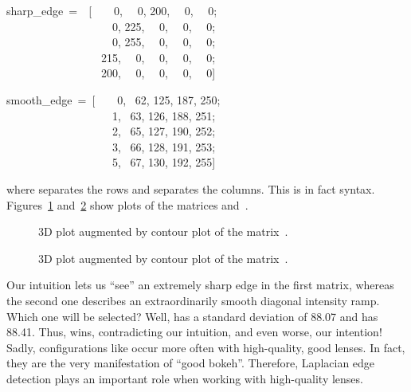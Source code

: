 \begin{literal}
  sharp\_edge~=~~[~~~~0,  ~~0,  200,  ~~0,  ~~0; \\
    ~~~~~~~~~~~~~~~~~~~0,  225,  ~~0,  ~~0,  ~~0; \\
    ~~~~~~~~~~~~~~~~~~~0,  255,  ~~0,  ~~0,  ~~0; \\
    ~~~~~~~~~~~~~~~~~215,  ~~0,  ~~0,  ~~0,  ~~0; \\
    ~~~~~~~~~~~~~~~~~200,  ~~0,  ~~0,  ~~0,  ~~0]
\end{literal}

\begin{literal}
  smooth\_edge~=~[~~~~0,  ~62,  125,  187,  250; \\
    ~~~~~~~~~~~~~~~~~~~1,  ~63,  126,  188,  251; \\
    ~~~~~~~~~~~~~~~~~~~2,  ~65,  127,  190,  252; \\
    ~~~~~~~~~~~~~~~~~~~3,  ~66,  128,  191,  253; \\
    ~~~~~~~~~~~~~~~~~~~5,  ~67,  130,  192,  255]
\end{literal}

\noindent where \sample{;} separates the rows and \sample{,} separates
the columns.  This is in fact  syntax.
Figures~\ref{fig:sharp-edge} and~\ref{fig:smooth-edge} show plots of
the matrices  and~.


\begin{figure}[htbp]
  \begin{maxipage}
    \centering
  \end{maxipage}

  \caption[Sharp edge]{3D plot augmented by contour plot of the
    matrix~.\label{fig:sharp-edge}}
\end{figure}


\begin{figure}[htbp]
  \begin{maxipage}
    \centering
  \end{maxipage}

  \caption[Smooth edge]{3D plot augmented by contour plot of the
    matrix~.\label{fig:smooth-edge}}
\end{figure}


Our intuition lets us ``see'' an extremely sharp edge in the first
matrix, whereas the second one describes an extraordinarily smooth
diagonal intensity ramp.  Which one will be selected?  Well,
 has a standard deviation of 88.07 and
 has 88.41.  Thus,  wins,
contradicting our intuition, and even worse, our intention!  Sadly,
configurations like  occur more often with
high-quality, good  lenses.  In
fact, they are the very manifestation of ``good bokeh''.  Therefore,
Laplacian edge detection plays an important role when working with
high-quality lenses.


